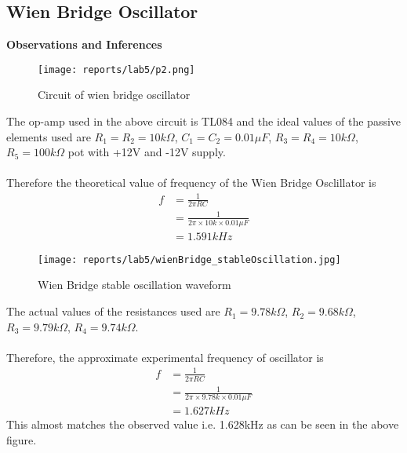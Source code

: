 \documentclass[12pt]{article}
\begin{document}
    \subsection{Wien Bridge Oscillator}
    
        \noindent
        \textbf{Observations and Inferences}\\
        
        \noindent
        \begin{figure}[H]
            \centering
            \texttt{[image: reports/lab5/p2.png]}
            \caption{Circuit of wien bridge oscillator}
        \end{figure}
        \noindent
        The op-amp used in the above circuit is TL084 and the ideal values of the passive elements used are $R_1 = R_2 = 10k\Omega$, $C_1 = C_2 = 0.01\mu F$, $R_3 = R_4 = 10k\Omega$, $R_5 = 100k\Omega$ pot with +12V and -12V supply.\\\\
        \noindent
        Therefore the theoretical value of frequency of the Wien Bridge Osclillator is
        \begin{align}
            f &= \frac{1}{2\pi RC}\\
              &= \frac{1}{2\pi \times10k\times0.01\mu F}\\
              &= 1.591kHz
        \end{align}
        \begin{figure}[H]
            \centering
            \texttt{[image: reports/lab5/wienBridge\_stableOscillation.jpg]}
            \caption{Wien Bridge stable oscillation waveform}
        \end{figure}
        \noindent
        The actual values of the resistances used are $R_1=9.78k\Omega$, $R_2=9.68k\Omega$, $R_3 = 9.79k\Omega$,  $R_4 = 9.74k\Omega$.\\\\
        Therefore, the approximate experimental frequency of oscillator is
        \begin{align}
            f &= \frac{1}{2\pi RC}\\
              &= \frac{1}{2\pi \times9.78k\times0.01\mu F}\\
              &= 1.627kHz
        \end{align}
        \noindent
        This almost matches the observed value i.e. 1.628kHz as can be seen in the above figure.
    \newpage
\end{document}
